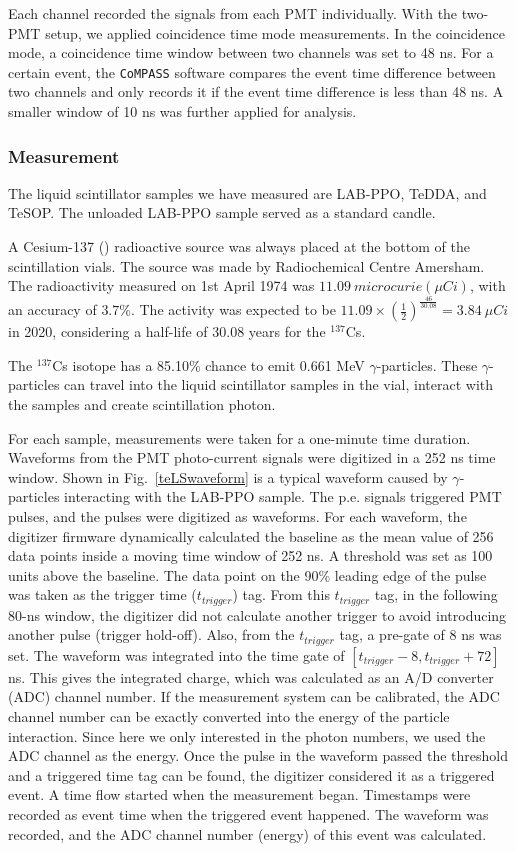 Each channel recorded the signals from each PMT individually. With the two-PMT setup, we applied coincidence time mode measurements. In the coincidence mode, a coincidence time window between two channels was set to 48 ns. For a certain event, the \texttt{CoMPASS} software compares the event time difference between two channels and only records it if the event time difference is less than 48 ns. A smaller window of 10 ns was further applied for analysis.

\subsubsection{Measurement}

The liquid scintillator samples we have measured are LAB-PPO, TeDDA, and TeSOP. The unloaded LAB-PPO sample served as a standard candle. 

A Cesium-137 () radioactive source was always placed at the bottom of the scintillation vials.
The source was made by Radiochemical Centre Amersham. The radioactivity measured on 1st April 1974 was $11.09~microcurie(\mu Ci)$, with an accuracy of $3.7\%$. The activity was expected to be 
$11.09\times ({\frac{1}{2}})^{\frac{46}{30.08}}=3.84~\mu Ci$ in 2020, considering a half-life of 30.08 years for the $^{137}$Cs\cite{nndc}.

The $^{137}$Cs isotope has a 85.10\% chance to emit 0.661 MeV $\gamma$-particles\cite{nndc}. These $\gamma$-particles can travel into the liquid scintillator samples in the vial, interact with the samples and create scintillation photon.

For each sample, measurements were taken for a one-minute time duration. Waveforms from the PMT photo-current signals were digitized in a 252 ns time window. Shown in Fig.~\ref{teLSwaveform} is a typical waveform caused by $\gamma$-particles interacting with the LAB-PPO sample. The p.e. signals triggered PMT pulses, and the pulses were digitized as waveforms. For each waveform, the digitizer firmware dynamically calculated the baseline as the mean value of 256 data points inside a moving time window of 252 ns. A threshold was set as 100 units above the baseline. The data point on the 90\% leading edge of the pulse was taken as the trigger time ($t_{trigger}$) tag.
From this $t_{trigger}$ tag, in the following 80-ns window, the digitizer did not calculate another trigger to avoid introducing another pulse (trigger hold-off). Also, from the $t_{trigger}$ tag, a pre-gate of 8 ns was set. The waveform was integrated into the time gate of $[t_{trigger}-8, t_{trigger}+72]$ ns. This gives the integrated charge, which was calculated as an A/D converter (ADC) channel number. If the measurement system can be calibrated, the ADC channel number can be exactly converted into the energy of the particle interaction. Since here we only interested in the photon numbers, we used the ADC channel as the energy. Once the pulse in the waveform passed the threshold and a triggered time tag can be found, the digitizer considered it as a triggered event. A time flow started when the measurement began. Timestamps were recorded as event time when the triggered event happened. The waveform was recorded, and the ADC channel number (energy) of this event was calculated.

